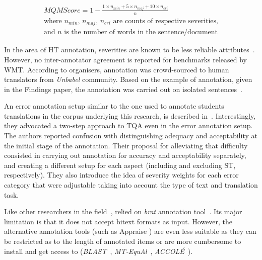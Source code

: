
\begin{equation}\label{eq:mqm_score}
\begin{split}
MQM Score = 1 - \frac{1\times n_{min} + 5\times n_{maj} + 10\times n_{cri}}{n} \\
\text{where $n_{min}$, $n_{maj}$, $n_{cri}$ are counts of respective severities,} \\
\text{and $n$ is the number of words in the sentence/document}
\end{split}
\end{equation}

In the area of HT annotation, severities are known to be less reliable attributes~\cite[p.33]{HuertasBarros2018}. However, no inter-annotator agreement is reported for benchmarks released by WMT. According to organisers, annotation was crowd-sourced to human translators from \textit{Unbabel} community. Based on the example of annotation, given in the Findings paper, the annotation was carried out on isolated sentences~\cite[p.3]{Fonseca2019}. 

\label{pg:daems_two-stage_errorann}
An error annotation setup similar to the one used to annotate students translations in the corpus underlying this research, is described in~\citet{Daems2013, Daems2017}. Interestingly, they advocated a two-step approach to \gls*{TQA} even in the error annotation setup. The authors reported confusion with distinguishing adequacy and acceptability at the initial stage of the annotation. Their proposal for alleviating that difficulty consisted in carrying out annotation for accuracy and acceptability separately, and creating a different setup for each aspect (including and excluding ST, respectively). 
They also introduce the idea of severity weights for each error category that were adjustable taking into account the type of text and translation task.

Like other researchers in the field~\cite{Kubler2018,Verplaetse2019}, \citet{Daems2017} relied on \textit{brat} annotation tool~\cite{Stenetorp2012}. Its major limitation is that it does not accept bitext formats as input. 
However, the alternative annotation tools (such as Appraise \cite{Federmann2010}) are even less suitable as they can be restricted as to the length of annotated items or are more cumbersome to install and get access to (\textit{BLAST}~\cite{Stymne2011}, \textit{MT-EquAl}~\cite{Girardi2014}, \textit{ACCOL\'E}~\cite{EsperancaRodier2019}).

